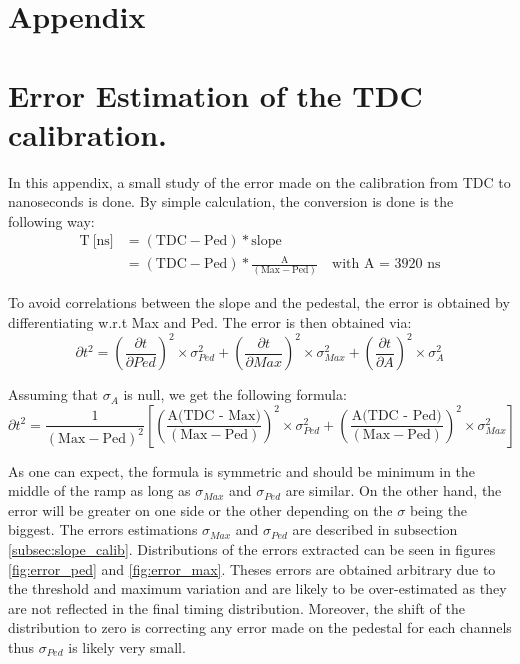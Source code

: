 \documentclass[twoside,a4paper,11pt]{article}
\begin{document}
\clearpage
\begin{appendix}
\section*{Appendix}
\pagestyle{plain}
\setcounter{table}{0}
\renewcommand{\thetable}{\Alph{section}\arabic{table}}

\section{Error Estimation of the TDC calibration.}
\label{appendix:calib_error}

In this appendix, a small study of the error made on the calibration from TDC to nanoseconds is done. By simple calculation, the conversion is done is the following way:
\begin{equation*}
\begin{split}
\text{T} \: \text{[ns]} & = ( \text{TDC} - \text{Ped} ) * \text{slope} \\
& = ( \text{TDC} - \text{Ped} ) * \frac{\text{A}}{(\text{Max} - \text{Ped})} \quad \text{with A = 3920 ns}
\end{split}
\end{equation*}

To avoid correlations between the slope and the pedestal, the error is obtained by differentiating w.r.t Max and Ped. The error is then obtained via:
\begin{equation*}
\partial t^2 = \left(\frac{\partial t}{\partial Ped}\right)^2 \times \sigma_{Ped}^2 + \left(\frac{\partial t}{\partial Max}\right)^2 \times \sigma_{Max}^2 + \left(\frac{\partial t}{\partial A}\right)^2 \times \sigma_{A}^2
\end{equation*}

Assuming that $\sigma_{A}$ is null, we get the following formula:
\begin{equation*}
\partial t^2 = \frac{1}{(\text{Max} - \text{Ped})^2} \left[ \left( \frac{\text{A(TDC - Max)}}{(\text{Max} - \text{Ped})} \right)^2 \times \sigma_{Ped}^2 + \left( \frac{\text{A(TDC - Ped)}}{(\text{Max} - \text{Ped})} \right)^2 \times \sigma_{Max}^2 \right]
\end{equation*}

As one can expect, the formula is symmetric and should be minimum in the middle of the ramp as long as $\sigma_{Max}$ and $\sigma_{Ped}$ are similar. On the other hand, the error will be greater on one side or the other depending on the $\sigma$ being the biggest. The errors estimations $\sigma_{Max}$ and $\sigma_{Ped}$ are described in subsection \ref{subsec:slope_calib}. Distributions of the errors extracted can be seen in figures \ref{fig:error_ped} and \ref{fig:error_max}. Theses errors are obtained arbitrary due to the threshold and maximum variation and are likely to be over-estimated as they are not reflected in the final timing distribution. Moreover, the shift of the distribution to zero is correcting any error made on the pedestal for each channels thus $\sigma_{Ped}$ is likely very small.


\end{appendix}
\end{document}
